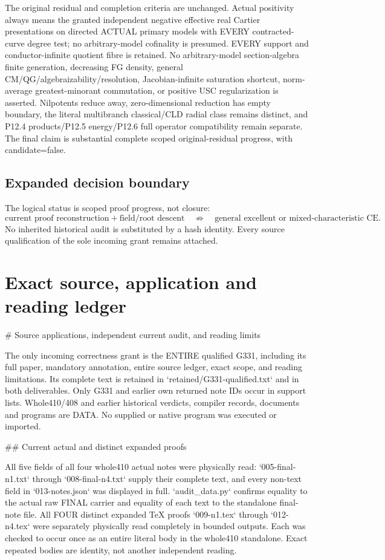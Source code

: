 \documentclass[11pt]{article}
\begin{document}
The original residual and completion criteria are unchanged. Actual positivity always means the granted independent negative effective real Cartier presentations on directed ACTUAL primary models with EVERY contracted-curve degree test; no arbitrary-model cofinality is presumed. EVERY support and conductor-infinite quotient fibre is retained. No arbitrary-model section-algebra finite generation, decreasing FG density, general CM/QG/algebraizability/resolution, Jacobian-infinite saturation shortcut, norm-average greatest-minorant commutation, or positive USC regularization is asserted. Nilpotents reduce away, zero-dimensional reduction has empty boundary, the literal multibranch classical/CLD radial class remains distinct, and P12.4 products/P12.5 energy/P12.6 full operator compatibility remain separate. The final claim is substantial complete scoped original-residual progress, with candidate=false.

\subsection*{Expanded decision boundary}
The logical status is scoped proof progress, not closure:
\[
 \text{current proof reconstruction} + \text{field/root descent}
 \quad\not\Longrightarrow\quad
 \text{general excellent or mixed-characteristic CE}.
\]
No inherited historical audit is substituted by a hash identity. Every
source qualification of the sole incoming grant remains attached.


\section*{Exact source, application and reading ledger}
\# Source applications, independent current audit, and reading limits

The only incoming correctness grant is the ENTIRE qualified G331, including its full paper, mandatory annotation, entire source ledger, exact scope, and reading limitations. Its complete text is retained in `retained/G331-qualified.txt` and in both deliverables. Only G331 and earlier own returned note IDs occur in support lists. Whole410/408 and earlier historical verdicts, compiler records, documents and programs are DATA. No supplied or native program was executed or imported.

\#\# Current actual and distinct expanded proofs

All five fields of all four whole410 actual notes were physically read: `005-final-n1.txt` through `008-final-n4.txt` supply their complete text, and every non-text field in `013-notes.json` was displayed in full. `audit\_data.py` confirms equality to the actual raw FINAL carrier and equality of each text to the standalone final-note file. All FOUR distinct expanded TeX proofs `009-n1.tex` through `012-n4.tex` were separately physically read completely in bounded outputs. Each was checked to occur once as an entire literal body in the whole410 standalone. Exact repeated bodies are identity, not another independent reading.
\end{document}

